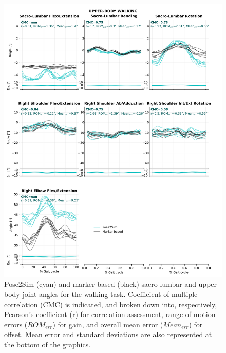 \begin{figure}[!ht]
	\centering
	\def\svgwidth{1\columnwidth}
	\fontsize{10pt}{10pt}\selectfont
	\includegraphics[height=\dimexpr\textheight-119pt]{"../Annexes/Figures/Fig_QTMWalkUp.png"}
	\caption{Pose2Sim (cyan) and marker-based (black) sacro-lumbar and upper-body joint angles for the walking task. Coefficient of multiple correlation (CMC) is indicated, and broken down into, respectively, Pearson’s coefficient (r) for correlation assessment, range of motion errors (\(ROM_{err}\)) for gain, and overall mean error (\(Mean_{err}\)) for offset. Mean error and standard deviations are also represented at the bottom of the graphics.}
	\label{fig_qtmwalkup}
\end{figure}

